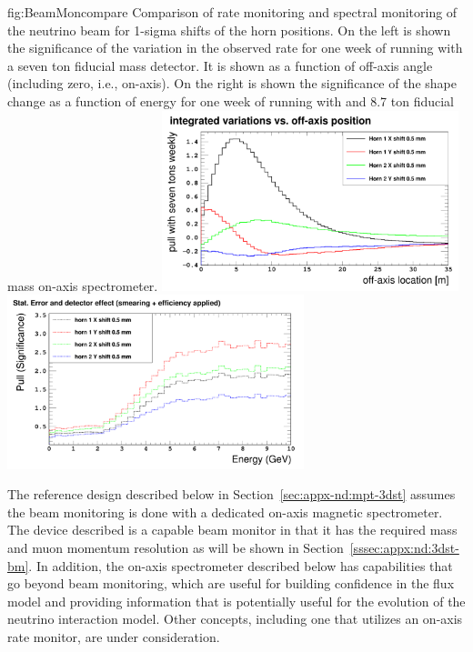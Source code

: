 \begin{dunefigure}{fig:BeamMoncompare}
{Comparison of rate monitoring and spectral monitoring of the neutrino beam for  1-sigma shifts of the horn positions.  On the left is shown the significance of the variation in the observed rate for one week of running with a seven ton fiducial mass detector.  It is shown as a function of off-axis angle (including zero, i.e., on-axis). On the right is shown the significance of the shape change as a function of energy for one week of running with and 8.7 ton fiducial mass on-axis spectrometer.}
  \includegraphics[width=3.4in]{graphics/beamSpec1.png}
    \includegraphics[width=3.4in]{graphics/beamSpec6.png}
\end{dunefigure}

The reference design described below in Section~\ref{sec:appx-nd:mpt-3dst} assumes the beam monitoring is done with a dedicated on-axis magnetic spectrometer.  The device described is a capable beam monitor in that it has the required mass and muon momentum resolution as will be shown in Section~\ref{sssec:appx:nd:3dst-bm}.  In addition, the on-axis spectrometer described below has capabilities that go beyond beam monitoring, which are useful for building confidence in the flux model and providing information that is potentially useful for the evolution of the neutrino interaction model.  Other concepts, including one that utilizes an on-axis rate monitor, are under consideration.


